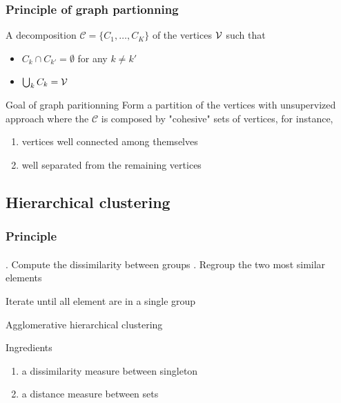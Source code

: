 \documentclass{beamer}\usepackage[]{graphicx}\usepackage[]{color}
\begin{document}
\begin{frame}
  \frametitle{Principle of graph partionning}

  \begin{definition}[Partition]
    A decomposition $\mathcal{C} = \{C_1,\dots,C_K\}$ of the vertices $\mathcal{V}$ such that
    \begin{itemize}
      \item $C_k \cap C_{k'} = \emptyset$ for any $k\neq k'$
      \item $\bigcup_{k} C_k = \mathcal{V}$
    \end{itemize}
  \end{definition}

  \vfill

  \begin{block}{Goal of graph paritionning}
    Form a partition of the vertices with unsupervized approach where the $\mathcal{C}$ is composed by \alert{"cohesive"} sets of vertices, for instance,
    \begin{enumerate}
      \item vertices well connected among themselves
      \item well separated from the remaining vertices
    \end{enumerate}
    
  \end{block}

\end{frame}

\subsection{Hierarchical clustering}

\begin{frame}
  \frametitle{Principle}
  \framesubtitle{}

  \begin{algorithm}[H]
    \BlankLine\BlankLine
    . Compute the dissimilarity between groups . Regroup the two most similar elements \;
      
      Iterate until all element are in a single group \;
    \BlankLine\BlankLine

    \caption{Agglomerative hierarchical clustering}
  \end{algorithm}
  
  \begin{block}{Ingredients}
    \begin{enumerate}
      \item a dissimilarity measure between singleton
      \item a distance measure between sets
    \end{enumerate}
  \end{block}

\end{frame}
\end{document}
